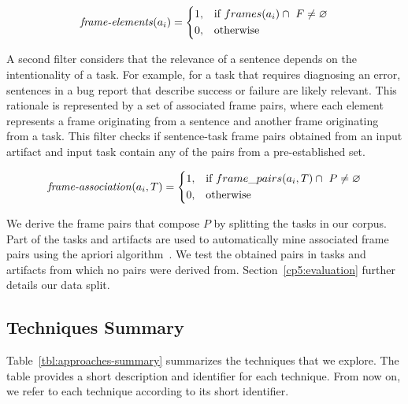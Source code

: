 \begin{equation}
\text{\textit{frame-elements}}(a_i) = \left \{
\begin{aligned}
    &1, && \text{if}\ frames(a_i) \cap ~F \ne \emptyset \\
    &0, && \text{otherwise}
\end{aligned} \right.
\end{equation} 


\medskip
A second filter considers that the relevance of a sentence depends on the intentionality of a task. 
For example, for a task that requires diagnosing an error, sentences in a bug report that describe success or failure are likely relevant. 
This rationale is represented by a set of associated frame pairs, where each element represents a frame originating from a sentence and another frame originating from a task.
This filter checks if sentence-task frame pairs obtained from an input artifact and input task contain any of the pairs from a pre-established set. 




\begin{equation}
\text{\textit{frame-association}}(a_i, T) = \left \{
\begin{aligned}
    &1, && \text{if}\ frame\_pairs(a_i, T) \cap ~P \ne \emptyset \\
    &0, && \text{otherwise}
\end{aligned} \right.
\end{equation} 


\smallskip
We derive the frame pairs that compose $P$ by splitting the tasks in our corpus.
Part of the tasks and artifacts are used to automatically
mine associated frame pairs using the apriori algorithm~\cite{agrawal1994apriori}. 
 We test the obtained pairs in tasks and artifacts from which no pairs were derived from.  
Section~\ref{cp5:evaluation} further details our data split.









\subsection{Techniques Summary}


Table~\ref{tbl:approaches-summary} summarizes the techniques that we explore.
The table provides a short description and identifier for each technique. From now on, we refer to each technique according to its short identifier.


